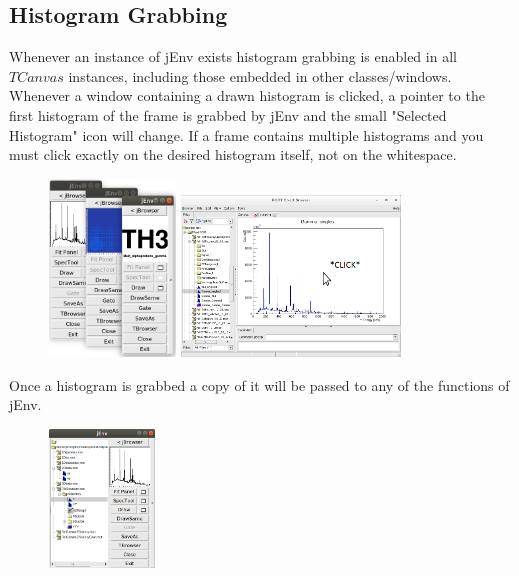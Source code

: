 \documentclass[a4paper,10pt]{article}
\begin{document}
\newpage
\subsection{Histogram Grabbing}
Whenever an instance of jEnv exists histogram grabbing is enabled in all $TCanvas$ instances, including those embedded in other classes/windows. Whenever a window containing a drawn histogram is clicked, a pointer to the first histogram of the frame is grabbed by jEnv and the small "Selected Histogram" icon will change. If a frame contains multiple histograms and you must click exactly on the desired histogram itself, not on the whitespace.

\begin{figure}[!h]
\centering
\includegraphics[width=0.3\textwidth]{jEnvB.png}
\includegraphics[width=0.52\textwidth]{jEnvD.png}     
\end{figure}

Once a histogram is grabbed a copy of it will be passed to any of the functions of jEnv.

\begin{figure}
\includegraphics[width=0.25\textwidth]{jEnvE.png}
\end{figure}
\end{document}
